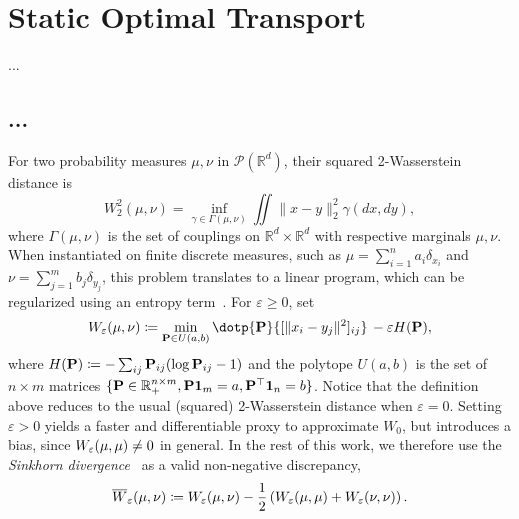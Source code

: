 \section{Static Optimal Transport}

...

\subsection{...}

For two probability measures $\mu, \nu$ in $\mathcal{P}(\mathbb{R}^d)$, their squared 2-Wasserstein distance is
\begin{equation} \label{eq:ot}
    W_2^2(\mu, \nu) = \inf_{\gamma\in \Gamma(\mu,\nu)}\iint \|x-y\|^2_2 \gamma(dx, dy),
\end{equation}
where $\Gamma(\mu, \nu)$ is the set of couplings on $\mathbb{R}^d\times\mathbb{R}^d$ with respective marginals $\mu, \nu$. When instantiated on finite discrete measures, such as $\mu=\sum_{i=1}^n a_i\delta_{x_i}$ and $\nu=\sum_{j=1}^m b_j\delta_{y_j}$, this problem translates to a linear program, which can be regularized using an entropy term~\citep{cuturi2013sinkhorn,peyre2019computational}. For $\varepsilon\geq0$, set 
\begin{equation}\label{eq:reg-ot}
\We(\mu,\nu) \defeq \min_{\bP\in U(a,b)} \dotp{\bP}{[\|x_i - y_j\|^2]_{ij}}  \,-\varepsilon H(\bP),
\end{equation}
where $H(\mathbf{P}) \coloneqq -\sum_{ij} \mathbf{P}_{ij} (\log \mathbf{P}_{ij} - 1)$ and the polytope $U(a,b)$ is the set of $n\times m$ matrices $\{\mathbf{P}\in\mathbb{R}^{n \times m}_+, \mathbf{P}\mathbf{1}_m =a, \mathbf{P}^\top\mathbf{1}_n=b\}$. 
Notice that the definition above reduces to the usual (squared) 2-Wasserstein distance when $\varepsilon=0$. Setting $\varepsilon>0$ yields a faster and differentiable proxy to approximate $W_{0}$, but introduces a bias, since $W_{\varepsilon}(\mu,\mu)\ne 0$ in general. %
In the rest of this work, we therefore use the \textit{Sinkhorn divergence}~\citep{ramdas2017wasserstein,genevay2018sample,salimans2018improving,feydy2018interpolating} as %
a valid non-negative discrepancy,
\begin{equation} \label{eq:sinkhorn}
\overline{W}_{\varepsilon}(\mu,\nu) \coloneqq W_{\varepsilon}(\mu,\nu)-\frac{1}{2}\left(W_{\varepsilon}(\mu,\mu)+W_{\varepsilon}(\nu,\nu)\right).\\
\end{equation}

